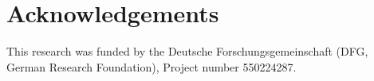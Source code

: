 \section*{Acknowledgements}
This research was funded by the Deutsche Forschungsgemeinschaft (DFG, German Research Foundation), Project number 550224287.
